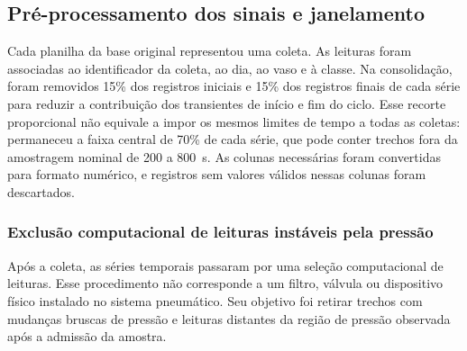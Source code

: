 \subsection{Pré-processamento dos sinais e janelamento}
\label{subsec:preprocessamento}

Cada planilha da base original representou uma coleta. As leituras foram
associadas ao identificador da coleta, ao dia, ao vaso e à classe. Na
consolidação, foram removidos 15\% dos registros iniciais e 15\% dos
registros finais de cada série para reduzir a contribuição dos transientes
de início e fim do ciclo. Esse recorte proporcional não equivale a impor
os mesmos limites de tempo a todas as coletas: permaneceu a faixa central
de 70\% de cada série, que pode conter trechos fora da amostragem nominal
de 200 a 800~s. As colunas necessárias foram
convertidas para formato numérico, e registros sem valores válidos nessas
colunas foram descartados.

\subsubsection{Exclusão computacional de leituras instáveis pela pressão}

Após a coleta, as séries temporais passaram por uma seleção computacional
de leituras. Esse procedimento não corresponde a um filtro, válvula ou
dispositivo físico instalado no sistema pneumático. Seu objetivo foi
retirar trechos com mudanças bruscas de pressão e leituras distantes da
região de pressão observada após a admissão da amostra.

